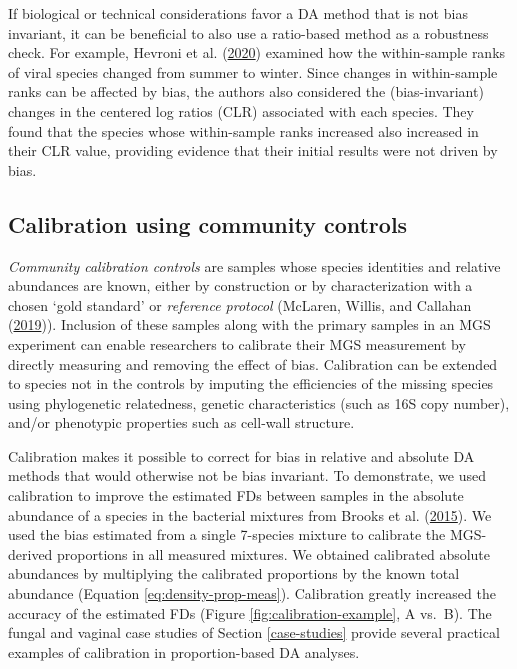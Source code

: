 \documentclass[
]{article}
\begin{document}
If biological or technical considerations favor a DA method that is not bias invariant, it can be beneficial to also use a ratio-based method as a robustness check.
For example, Hevroni et al. (\protect\hyperlink{ref-hevroni2020seas}{2020}) examined how the within-sample ranks of viral species changed from summer to winter.
Since changes in within-sample ranks can be affected by bias, the authors also considered the (bias-invariant) changes in the centered log ratios (CLR) associated with each species.
They found that the species whose within-sample ranks increased also increased in their CLR value, providing evidence that their initial results were not driven by bias.

\hypertarget{calibrate-compositions}{%
\subsection{Calibration using community controls}\label{calibrate-compositions}}

\emph{Community calibration controls} are samples whose species identities and relative abundances are known, either by construction or by characterization with a chosen `gold standard' or \emph{reference protocol} (McLaren, Willis, and Callahan (\protect\hyperlink{ref-mclaren2019cons}{2019})).
Inclusion of these samples along with the primary samples in an MGS experiment can enable researchers to calibrate their MGS measurement by directly measuring and removing the effect of bias.
Calibration can be extended to species not in the controls by imputing the efficiencies of the missing species using phylogenetic relatedness, genetic characteristics (such as 16S copy number), and/or phenotypic properties such as cell-wall structure.

Calibration makes it possible to correct for bias in relative and absolute DA methods that would otherwise not be bias invariant.
To demonstrate, we used calibration to improve the estimated FDs between samples in the absolute abundance of a species in the bacterial mixtures from Brooks et al. (\protect\hyperlink{ref-brooks2015thet}{2015}).
We used the bias estimated from a single 7-species mixture to calibrate the MGS-derived proportions in all measured mixtures.
We obtained calibrated absolute abundances by multiplying the calibrated proportions by the known total abundance (Equation \eqref{eq:density-prop-meas}).
Calibration greatly increased the accuracy of the estimated FDs (Figure \ref{fig:calibration-example}, A vs.~B).
The fungal and vaginal case studies of Section \ref{case-studies} provide several practical examples of calibration in proportion-based DA analyses.
\end{document}
